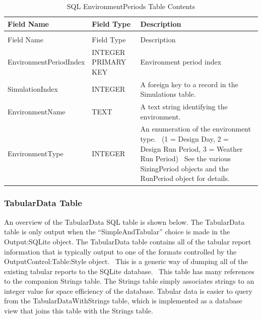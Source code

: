 \begin{longtable}[c]{>{\raggedright}p{1.5in}>{\raggedright}p{1.5in}>{\raggedright}p{3.0in}}
\caption{SQL EnvironmentPeriods Table Contents \label{table:table-37.-sql-environmentperiods-table}} \tabularnewline
\toprule
Field Name & Field Type & Description \tabularnewline
\midrule
\endfirsthead

\caption[]{SQL EnvironmentPeriods Table Contents} \tabularnewline
\toprule
Field Name & Field Type & Description \tabularnewline
\midrule
\endhead

Environment\-Period\-Index & INTEGER PRIMARY KEY & Environment period index \tabularnewline
SimulationIndex & INTEGER & A foreign key to a record in the Simulations table. \tabularnewline
EnvironmentName & TEXT & A text string identifying the environment. \tabularnewline
EnvironmentType & INTEGER & An enumeration of the environment type.~ (1 = Design Day, 2 =~ Design Run Period, 3 = Weather Run Period)~ See the various SizingPeriod objects and the RunPeriod object for details. \tabularnewline
\bottomrule
\end{longtable}

\subsubsection{TabularData Table}

An overview of the TabularData SQL table is shown below. The TabularData table is only output when the “SimpleAndTabular” choice is made in the Output:SQLite object. The TabularData table contains all of the tabular report information that is typically output to one of the formats controlled by the OutputControl:Table:Style object.  This is a generic way of dumping all of the existing tabular reports to the SQLite database.  This table has many references to the companion Strings table. The Strings table simply associates strings to an integer value for space efficiency of the database. Tabular data is easier to query from the TabularDataWithStrings table, which is implemented as a database view that joins this table with the Strings table.

